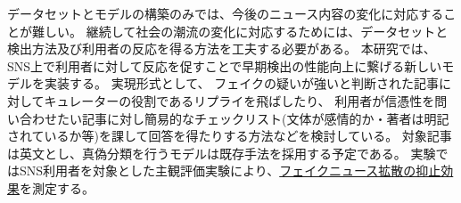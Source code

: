 
\vspace{20pt}
データセットとモデルの構築のみでは、今後のニュース内容の変化に対応することが難しい。
継続して社会の潮流の変化に対応するためには、データセットと検出方法及び利用者の反応を得る方法を工夫する必要がある。
本研究では、SNS上で利用者に対して反応を促すことで早期検出の性能向上に繋げる新しいモデルを実装する。
実現形式として、
フェイクの疑いが強いと判断された記事に対してキュレーターの役割であるリプライを飛ばしたり、
利用者が信憑性を問い合わせたい記事に対し簡易的なチェックリスト(文体が感情的か・著者は明記されているか等)を課して回答を得たりする方法などを検討している。
対象記事は英文とし、真偽分類を行うモデルは既存手法を採用する予定である。
実験ではSNS利用者を対象とした主観評価実験により、\underline{フェイクニュース拡散の抑止効果}を測定する。


